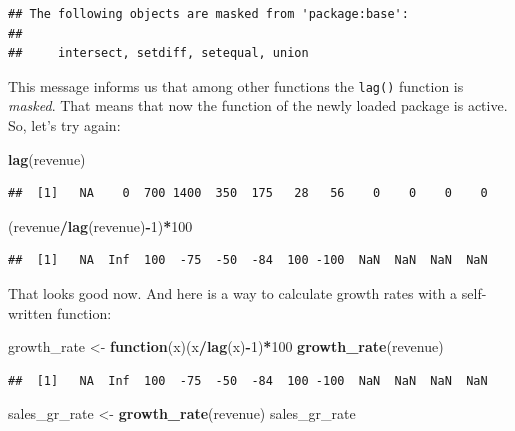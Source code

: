 \documentclass[
  12pt,
  oneside]{book}
\newenvironment{Shaded}{\begin{snugshade}}{\end{snugshade}}
\newcommand{\ControlFlowTok}[1]{\textcolor[rgb]{0.13,0.29,0.53}{\textbf{#1}}}
\newcommand{\DecValTok}[1]{\textcolor[rgb]{0.00,0.00,0.81}{#1}}
\newcommand{\FunctionTok}[1]{\textcolor[rgb]{0.13,0.29,0.53}{\textbf{#1}}}
\newcommand{\NormalTok}[1]{#1}
\newcommand{\OtherTok}[1]{\textcolor[rgb]{0.56,0.35,0.01}{#1}}
\newcommand{\SpecialCharTok}[1]{\textcolor[rgb]{0.81,0.36,0.00}{\textbf{#1}}}
\theoremstyle{definition}
\theoremstyle{definition}
\theoremstyle{definition}
\theoremstyle{definition}
\theoremstyle{remark}
\begin{document}
\begin{verbatim}
## The following objects are masked from 'package:base':
## 
##     intersect, setdiff, setequal, union
\end{verbatim}

This message informs us that among other functions the \texttt{lag()} function is \emph{masked}. That means that now the function of the newly loaded package is active. So, let's try again:

\begin{Shaded}
\begin{Highlighting}[]
\FunctionTok{lag}\NormalTok{(revenue)}
\end{Highlighting}
\end{Shaded}

\begin{verbatim}
##  [1]   NA    0  700 1400  350  175   28   56    0    0    0    0
\end{verbatim}

\begin{Shaded}
\begin{Highlighting}[]
\NormalTok{(revenue}\SpecialCharTok{/}\FunctionTok{lag}\NormalTok{(revenue)}\SpecialCharTok{{-}}\DecValTok{1}\NormalTok{)}\SpecialCharTok{*}\DecValTok{100} 
\end{Highlighting}
\end{Shaded}

\begin{verbatim}
##  [1]   NA  Inf  100  -75  -50  -84  100 -100  NaN  NaN  NaN  NaN
\end{verbatim}

That looks good now. And here is a way to calculate growth rates with a self-written function:

\begin{Shaded}
\begin{Highlighting}[]
\NormalTok{growth\_rate }\OtherTok{\textless{}{-}} \ControlFlowTok{function}\NormalTok{(x)(x}\SpecialCharTok{/}\FunctionTok{lag}\NormalTok{(x)}\SpecialCharTok{{-}}\DecValTok{1}\NormalTok{)}\SpecialCharTok{*}\DecValTok{100} 
\FunctionTok{growth\_rate}\NormalTok{(revenue)}
\end{Highlighting}
\end{Shaded}

\begin{verbatim}
##  [1]   NA  Inf  100  -75  -50  -84  100 -100  NaN  NaN  NaN  NaN
\end{verbatim}

\begin{Shaded}
\begin{Highlighting}[]
\NormalTok{sales\_gr\_rate }\OtherTok{\textless{}{-}} \FunctionTok{growth\_rate}\NormalTok{(revenue)}
\NormalTok{sales\_gr\_rate}
\end{Highlighting}
\end{Shaded}
\end{document}
